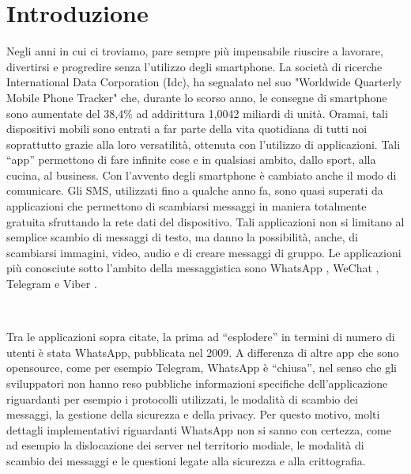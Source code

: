 \documentclass[a4paper,11pt]{book}
\begin{document}
\begin{frontespizio}
\end{frontespizio}


\tableofcontents

\chapter{Introduzione}
Negli anni in cui ci troviamo, pare sempre pi\`u impensabile riuscire a lavorare, divertirsi e progredire senza l'utilizzo degli smartphone. La società di ricerche International Data Corporation (Idc), ha segnalato nel suo "Worldwide Quarterly Mobile Phone Tracker" che, durante lo scorso anno, le consegne di smartphone sono aumentate del 38,4\% ad addirittura 1,0042 miliardi di unità.
Oramai, tali dispositivi mobili sono entrati a far parte della vita quotidiana di tutti noi soprattutto grazie alla loro versatilit\`a, ottenuta con l'utilizzo di applicazioni.
Tali ``app'' permettono di fare infinite cose e in qualsiasi ambito, dallo sport, alla cucina, al business. Con l'avvento degli smartphone \`e cambiato anche il modo di comunicare.
Gli SMS, utilizzati fino a qualche anno fa, sono quasi superati da applicazioni che permettono di scambiarsi messaggi in maniera totalmente gratuita sfruttando la rete dati del dispositivo. Tali applicazioni non si limitano al semplice scambio di messaggi di testo, ma danno la possibilit\`a, anche, di scambiarsi immagini, video, audio e di creare messaggi di gruppo.
Le applicazioni pi\`u conosciute sotto l'ambito della messaggistica sono WhatsApp \cite{rif1}, WeChat \cite{rif2}, Telegram \cite{rif3} e Viber \cite{rif4}.

~

Tra le applicazioni sopra citate, la prima ad ``esplodere'' in termini di numero di utenti \`e stata WhatsApp, pubblicata nel 2009. A differenza di altre app che sono opensource, come per esempio Telegram, WhatsApp \`e ``chiusa'', nel senso che gli sviluppatori non hanno reso pubbliche informazioni specifiche dell'applicazione riguardanti per esempio i protocolli utilizzati, le modalit\`a di scambio dei messaggi, la gestione della sicurezza e della privacy.
Per questo motivo, molti dettagli implementativi riguardanti WhatsApp non si sanno con certezza, come ad esempio la dislocazione dei server nel territorio modiale, le modalit\`a di scambio dei messaggi e le questioni legate alla sicurezza e alla crittografia.
\end{document}

